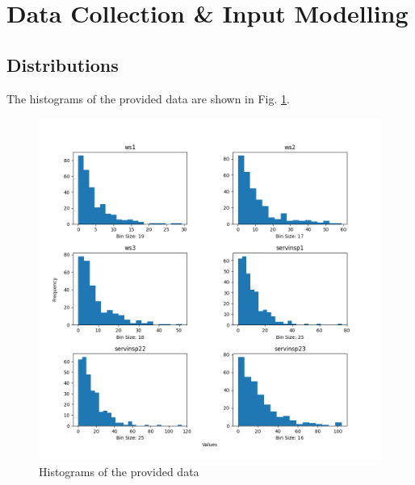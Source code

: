 \documentclass[final, hidelinks, 12pt, a4paper]{article}
\begin{document}
    \pagestyle{fancy}
    \cfoot{}



    \section{Data Collection \& Input Modelling}
    \subsection{Distributions}
    \label{sct:distributions}
    The histograms of the provided data are shown in Fig. \ref{fig:histo}.
    \begin{figure}[htbp]
        \centering
        \includegraphics[width=\linewidth]{data_histogram_plots.png}
        \caption{Histograms of the provided data}
        \label{fig:histo}
    \end{figure}
    \clearpage
\end{document}
